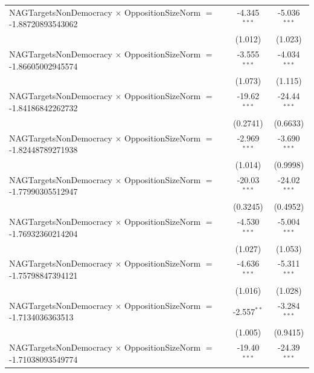 \begin{tabular}{lcc}
   NAGTargetsNonDemocracy $\times$ OppositionSizeNorm $=$ -1.88720893543062     & -4.345$^{***}$       & -5.036$^{***}$\\   
                                                                                & (1.012)              & (1.023)\\   
   NAGTargetsNonDemocracy $\times$ OppositionSizeNorm $=$ -1.86605002945574     & -3.555$^{***}$       & -4.034$^{***}$\\   
                                                                                & (1.073)              & (1.115)\\   
   NAGTargetsNonDemocracy $\times$ OppositionSizeNorm $=$ -1.84186842262732     & -19.62$^{***}$       & -24.44$^{***}$\\   
                                                                                & (0.2741)             & (0.6633)\\   
   NAGTargetsNonDemocracy $\times$ OppositionSizeNorm $=$ -1.82448789271938     & -2.969$^{***}$       & -3.690$^{***}$\\   
                                                                                & (1.014)              & (0.9998)\\   
   NAGTargetsNonDemocracy $\times$ OppositionSizeNorm $=$ -1.77990305512947     & -20.03$^{***}$       & -24.02$^{***}$\\   
                                                                                & (0.3245)             & (0.4952)\\   
   NAGTargetsNonDemocracy $\times$ OppositionSizeNorm $=$ -1.76932360214204     & -4.530$^{***}$       & -5.004$^{***}$\\   
                                                                                & (1.027)              & (1.053)\\   
   NAGTargetsNonDemocracy $\times$ OppositionSizeNorm $=$ -1.75798847394121     & -4.636$^{***}$       & -5.311$^{***}$\\   
                                                                                & (1.016)              & (1.028)\\   
   NAGTargetsNonDemocracy $\times$ OppositionSizeNorm $=$ -1.7134036363513      & -2.557$^{**}$        & -3.284$^{***}$\\   
                                                                                & (1.005)              & (0.9415)\\   
   NAGTargetsNonDemocracy $\times$ OppositionSizeNorm $=$ -1.71038093549774     & -19.40$^{***}$       & -24.39$^{***}$\\   

\end{tabular}
